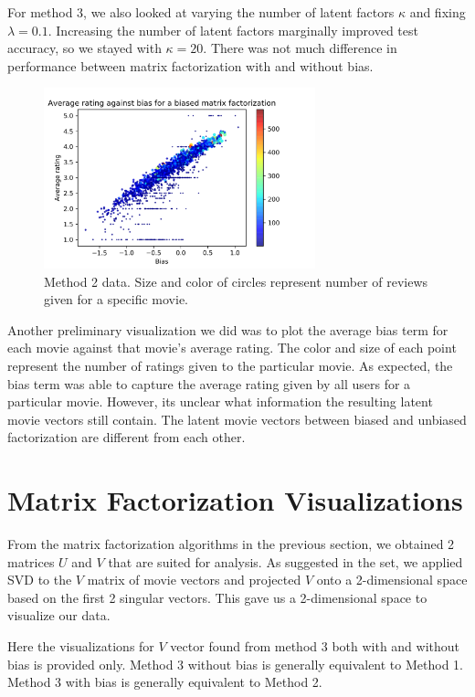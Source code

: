 For method 3, we also looked at varying the number of latent factors $\kappa$ and fixing $\lambda=0.1$. Increasing the number of latent factors marginally improved test accuracy, so we stayed with $\kappa=20$. There was not much difference in performance between matrix factorization with and without bias.

\begin{figure}[H]
	\centering
	\includegraphics[width=0.7\textwidth]{RatingVsBias.png}
	\caption{Method 2 data. Size and color of circles represent number of reviews given for a specific movie.}
\end{figure}

Another preliminary visualization we did was to plot the average bias term for each movie against that movie's average rating. The color and size of each point represent the number of ratings given to the particular movie. As expected, the bias term was able to capture the average rating given by all users for a particular movie. However, its unclear what information the resulting latent movie vectors still contain. The latent movie vectors between biased and unbiased factorization are different from each other. \newline

\section{Matrix Factorization Visualizations}

From the matrix factorization algorithms in the previous section, we obtained 2 matrices $U$ and $V$ that are suited for analysis. As suggested in the set, we applied SVD to the $V$ matrix of movie vectors and projected $V$ onto a 2-dimensional space based on the first 2 singular vectors. This gave us a 2-dimensional space to visualize our data. \newline

Here the visualizations for $V$ vector found from method 3 both with and without bias is provided only. Method 3 without bias is generally equivalent to Method 1. Method 3 with bias is generally equivalent to Method 2. \newline

